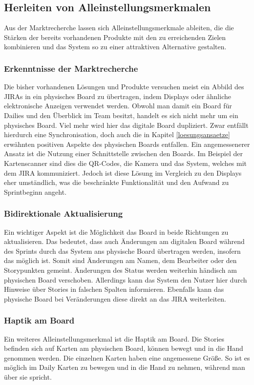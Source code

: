 \documentclass[12pt,titlepage]{scrartcl}
\begin{document}
	\subsection{Herleiten von Alleinstellungsmerkmalen}	
	Aus der Marktrecherche lassen sich Alleinstellungsmerkmale ableiten, die die Stärken der bereits vorhandenen Produkte mit den zu erreichenden Zielen kombinieren und das System so zu einer attraktiven Alternative gestalten.
		\subsubsection{Erkenntnisse der Marktrecherche}
		Die bisher vorhandenen Lösungen und Produkte versuchen meist ein Abbild des JIRAs in ein physisches Board zu übertragen, indem Displays oder ähnliche elektronische Anzeigen verwendet werden. Obwohl man damit ein Board für Dailies und den Überblick im Team besitzt, handelt es sich nicht mehr um ein physisches Board. Viel mehr wird hier das digitale Board dupliziert. Zwar entfällt hierdurch eine Synchronisation, doch auch die in Kapitel \ref{loesungsansaetze} erwähnten positiven Aspekte des physischen Boards entfallen. Ein angemessenerer Ansatz ist die Nutzung einer Schnittstelle zwischen den Boards. Im Beispiel der Kartenscanner sind dies die QR-Codes, die Kamera und das System, welches mit dem JIRA kommuniziert. Jedoch ist diese Lösung im Vergleich zu den Displays eher umständlich, was die beschränkte Funktionalität und den Aufwand zu Sprintbeginn angeht.
		\subsubsection{Bidirektionale Aktualisierung}
		Ein wichtiger Aspekt ist die Möglichkeit das Board in beide Richtungen zu aktualisieren. Das bedeutet, dass auch Änderungen am digitalen Board während des Sprints durch das System ans physische Board übertragen werden, insofern das möglich ist. Somit sind Änderungen am Namen, dem Bearbeiter oder den Storypunkten gemeint. Änderungen des Status werden weiterhin händisch am physischen Board verschoben. Allerdings kann das System den Nutzer hier durch Hinweise über Stories in falschen Spalten informieren. Ebenfalls kann das physische Board bei Veränderungen diese direkt an das JIRA weiterleiten.
		\subsubsection{Haptik am Board}
		Ein weiteres Alleinstellungsmerkmal ist die Haptik am Board. Die Stories befinden sich auf Karten am physischen Board, können bewegt und in die Hand genommen werden. Die einzelnen Karten haben eine angemessene Größe. So ist es möglich im Daily Karten zu bewegen und in die Hand zu nehmen, während man über sie spricht. 
\end{document}
